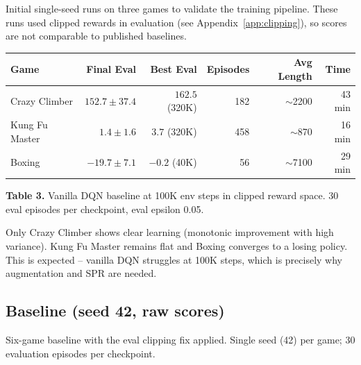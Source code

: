 \documentclass[11pt]{article}
\begin{document}
Initial single-seed runs on three games to validate the training
pipeline. These runs used clipped rewards in evaluation (see
Appendix~\ref{app:clipping}), so scores are not comparable to published
baselines.

\begin{table}[h]
\centering
\renewcommand{\arraystretch}{1.3}
\setlength{\tabcolsep}{8pt}
\begin{tabular}{l r r r r r}
\toprule
\textbf{Game}
  & \textbf{Final Eval}
  & \textbf{Best Eval}
  & \textbf{Episodes}
  & \textbf{Avg Length}
  & \textbf{Time} \\
\midrule
Crazy Climber  & $152.7 \pm 37.4$   & $162.5$ (320K)  & 182 & $\sim$2200  & 43 min \\
Kung Fu Master & $1.4 \pm 1.6$      & $3.7$ (320K)    & 458 & $\sim$870   & 16 min \\
Boxing         & $-19.7 \pm 7.1$    & $-0.2$ (40K)    & 56  & $\sim$7100  & 29 min \\
\bottomrule
\end{tabular}

\vspace{1.2em}
{\raggedright\small \textbf{Table 3.} Vanilla DQN baseline at 100K env
steps in clipped reward space. 30 eval episodes per checkpoint,
eval epsilon 0.05.\par}
\end{table}

\noindent Only Crazy Climber shows clear learning (monotonic improvement
with high variance). Kung Fu Master remains flat and Boxing converges to
a losing policy. This is expected -- vanilla DQN struggles at 100K
steps, which is precisely why augmentation and SPR are needed.

\subsection{Baseline (seed 42, raw scores)}

Six-game baseline with the eval clipping fix applied. Single seed (42)
per game; 30 evaluation episodes per checkpoint.
\end{document}
